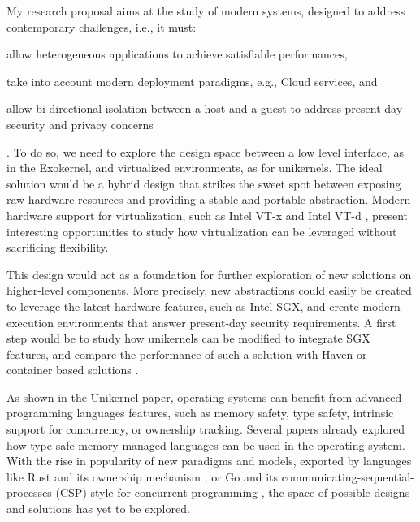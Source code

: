 My research proposal aims at the study of modern systems, designed to address contemporary challenges, i.e., it must:
\begin{enumerate*}
	\item allow heterogeneous applications to achieve satisfiable performances,
	\item take into account modern deployment paradigms, e.g., Cloud services, and 
	\item allow bi-directional isolation between a host and a guest to address present-day security and privacy concerns
\end{enumerate*}.
To do so, we need to explore the design space between a low level interface, as in the Exokernel, and virtualized environments, as for unikernels.
The ideal solution would be a hybrid design that strikes the sweet spot between exposing raw hardware resources and providing a stable and portable abstraction.
Modern hardware support for virtualization, such as Intel VT-x \cite{DBLP:journals/computer/UhligNRSMABKLS05} and Intel VT-d \cite{intelVTD}, present interesting opportunities to study how virtualization can be leveraged without sacrificing flexibility.

This design would act as a foundation for further exploration of new solutions on higher-level components. 
More precisely, new abstractions could easily be created to leverage the latest hardware features, such as Intel SGX, and create modern execution environments that answer present-day security requirements.
A first step would be to study how unikernels can be modified to integrate SGX features, and compare the performance of such a solution with Haven or container based solutions \cite{DBLP:conf/osdi/ArnautovTGKMPLM16}.

As shown in the Unikernel paper, operating systems can benefit from advanced programming languages features, such as memory safety, type safety, intrinsic support for concurrency, or ownership tracking.
Several papers \cite{DBLP:conf/asplos/MadhavapeddyMRSSGSHC13,DBLP:conf/sosp/BershadSPSFBCE95,DBLP:journals/sigops/HuntL07} already explored how type-safe memory managed languages can be used in the operating system.
With the rise in popularity of new paradigms and models, exported by languages like Rust and its ownership mechanism \cite{rust}, or Go and its communicating-sequential-processes (CSP) style for concurrent programming \cite{golang}, the space of possible designs and solutions has yet to be explored.